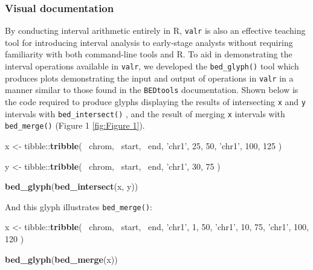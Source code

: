 \documentclass[9pt,a4paper]{extarticle}
\renewcommand{\KeywordTok}[1]{\textbf{{#1}}}
\renewcommand{\DecValTok}[1]{\textcolor[rgb]{0.00,0.00,1.00}{{#1}}}
\renewcommand{\StringTok}[1]{\textcolor[rgb]{0.87,0.00,0.00}{{#1}}}
\renewcommand{\NormalTok}[1]{{#1}}
\begin{document}
\subsubsection*{Visual documentation}\label{visual-documentation}
By conducting interval arithmetic entirely in R, \texttt{valr} is also an effective teaching tool for introducing interval analysis to early-stage analysts without requiring familiarity with both command-line tools and R. To aid in demonstrating the interval operations available in \texttt{valr}, we developed the \texttt{bed\_glyph()} tool which produces plots demonstrating the input and output of operations in \texttt{valr} in a manner similar to those found in the \texttt{BEDtools} documentation.
Shown below is the code required to produce glyphs displaying the results of intersecting \texttt{x} and \texttt{y} intervals with \texttt{bed\_intersect()} , and the result of merging \texttt{x} intervals with \texttt{bed\_merge()} (Figure 1 \ref{fig:Figure 1}).

\begin{Highlighting}[]
\NormalTok{x <-}\StringTok{ }\NormalTok{tibble::}\KeywordTok{tribble}\NormalTok{(}
  \NormalTok{~chrom, ~start, ~end,}
  \StringTok{'chr1'}\NormalTok{, }\DecValTok{25}\NormalTok{,     }\DecValTok{50}\NormalTok{,}
  \StringTok{'chr1'}\NormalTok{, }\DecValTok{100}\NormalTok{,    }\DecValTok{125}
\NormalTok{)}

\NormalTok{y <-}\StringTok{ }\NormalTok{tibble::}\KeywordTok{tribble}\NormalTok{(}
  \NormalTok{~chrom, ~start, ~end,}
  \StringTok{'chr1'}\NormalTok{, }\DecValTok{30}\NormalTok{,     }\DecValTok{75}
\NormalTok{)}

\KeywordTok{bed_glyph}\NormalTok{(}\KeywordTok{bed_intersect}\NormalTok{(x, y))}
\end{Highlighting}

And this glyph illustrates \texttt{bed\_merge()}:

\begin{Highlighting}[]
\NormalTok{x <-}\StringTok{ }\NormalTok{tibble::}\KeywordTok{tribble}\NormalTok{(}
  \NormalTok{~chrom, ~start, ~end,}
  \StringTok{'chr1'}\NormalTok{,      }\DecValTok{1}\NormalTok{,      }\DecValTok{50}\NormalTok{,}
  \StringTok{'chr1'}\NormalTok{,      }\DecValTok{10}\NormalTok{,     }\DecValTok{75}\NormalTok{,}
  \StringTok{'chr1'}\NormalTok{,      }\DecValTok{100}\NormalTok{,    }\DecValTok{120}
\NormalTok{)}

\KeywordTok{bed_glyph}\NormalTok{(}\KeywordTok{bed_merge}\NormalTok{(x))}
\end{Highlighting}
%
\end{document}
